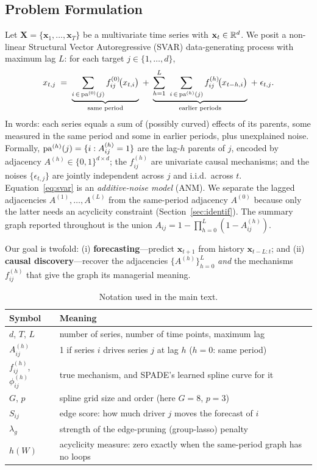 \subsection{Problem Formulation}
\label{sec:formulation}

Let $\mathbf{X} = \{\mathbf{x}_1, \dots, \mathbf{x}_T\}$ be a multivariate time
series with $\mathbf{x}_t \in \mathbb{R}^d$. We posit a non-linear Structural
Vector Autoregressive (SVAR) data-generating process with maximum lag $L$: for
each target $j\in\{1,\dots,d\}$,
\begin{equation}
    x_{t,j} \;=\; \underbrace{\sum_{i\,\in\,\mathrm{pa}^{(0)}(j)} f^{(0)}_{ij}\!\big(x_{t,i}\big)}_{\text{same period}}
    \;+\; \underbrace{\sum_{h=1}^{L}\ \sum_{i\,\in\,\mathrm{pa}^{(h)}(j)} f^{(h)}_{ij}\!\big(x_{t-h,i}\big)}_{\text{earlier periods}}
    \;+\; \epsilon_{t,j}.
    \label{eq:svar}
\end{equation}
In words: each series equals a sum of (possibly curved) effects of its parents,
some measured in the same period and some in earlier periods, plus unexplained
noise. Formally, $\mathrm{pa}^{(h)}(j)=\{i: A^{(h)}_{ij}=1\}$ are the lag-$h$ parents of
$j$, encoded by adjacency $A^{(h)}\in\{0,1\}^{d\times d}$; the $f^{(h)}_{ij}$ are
univariate causal mechanisms; and the noises $\{\epsilon_{t,j}\}$ are jointly
independent across $j$ and i.i.d.\ across $t$. Equation~\eqref{eq:svar} is an
\emph{additive-noise model} (ANM). We separate the lagged adjacencies
$A^{(1)},\dots,A^{(L)}$ from the same-period adjacency $A^{(0)}$ because only the
latter needs an acyclicity constraint (Section~\ref{sec:identif}). The summary
graph reported throughout is the union $A_{ij}=1-\prod_{h=0}^{L}(1-A^{(h)}_{ij})$.

Our goal is twofold: (i) \textbf{forecasting}---predict $\mathbf{x}_{t+1}$ from
history $\mathbf{x}_{t-L:t}$; and (ii) \textbf{causal discovery}---recover the
adjacencies $\{A^{(h)}\}_{h=0}^{L}$ \emph{and} the mechanisms $f^{(h)}_{ij}$
that give the graph its managerial meaning.

\begin{table}[t]
\centering
\caption{Notation used in the main text.}
\label{tab:notation}
\small
\begin{tabular}{@{}p{}p{}@{}}
\toprule
Symbol & Meaning \\
\midrule
$d$, $T$, $L$ & number of series, number of time points, maximum lag \\
$A^{(h)}_{ij}$ & 1 if series $i$ drives series $j$ at lag $h$ ($h{=}0$: same period) \\
$f^{(h)}_{ij}$, $\phi^{(h)}_{ij}$ & true mechanism, and SPADE's learned spline curve for it \\
$G$, $p$ & spline grid size and order (here $G{=}8$, $p{=}3$) \\
$S_{ij}$ & edge score: how much driver $j$ moves the forecast of $i$ \\
$\lambda_g$ & strength of the edge-pruning (group-lasso) penalty \\
$h(W)$ & acyclicity measure: zero exactly when the same-period graph has no loops \\
\bottomrule
\end{tabular}
\end{table}

